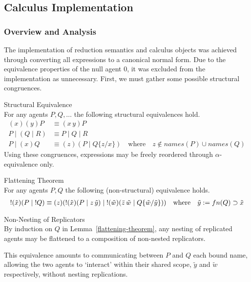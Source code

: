 \subsection{Calculus Implementation}\label{ssec:calculus-implementation}
    
    \subsubsection{Overview and Analysis}\label{sssec:calculus-analysis}
        The implementation of reduction semantics and calculus objects was achieved through converting all expressions to a canonical normal form.
        Due to the equivalence properties of the null agent $0$, it was excluded from the implementation as unnecessary.
        First, we must gather some possible structural congruences.

        \begin{lemma}{Structural Equivalence\\}
            For any agents $P, Q, \ldots$ the following structural equivalences hold.
            \begin{align*}
                (x)(y) P                & \equiv (x \, y) P \\
                P \; | \; (Q \; | \; R) & \equiv P \; | \; Q \; | \; R \\
                P \; | \; (x) Q         & \equiv (z)(P \; | \; Q\{z / x\}) \quad \text{where} \quad z \notin names(P) \cup names(Q)
            \end{align*}
            Using these congruences, expressions may be freely reordered through $\alpha$-equivalence only.
        \end{lemma}

        \begin{lemma}{Flattening Theorem\\}\label{flattening-theorem}
            For any agents $P, Q$ the following (non-structural) equivalence holds.
            \begin{align*}
                !(\tilde{x})(P \; | \; !Q) \equiv (z)(!(\tilde{x})(P \; | \; z \, \tilde{y}) \; | \; !(\tilde{w})(\bar{z} \, \tilde{w} \; | \; Q\{\tilde{w}/\tilde{y}\})) \quad \text{where} \quad \tilde{y} := fn(Q) \supset \tilde{x}
            \end{align*}
        \end{lemma}
        \begin{corollary*}{Non-Nesting of Replicators\\}
            By induction on $Q$ in Lemma~\ref{flattening-theorem}, any nesting of replicated agents may be flattened to a composition of non-nested replicators.
        \end{corollary*}
        This equivalence amounts to communicating between $P$ and $Q$ each bound name, allowing the two agents to `interact' within their shared scope, $\tilde{y}$ and $\tilde{w}$ respectively, without nesting replications.


